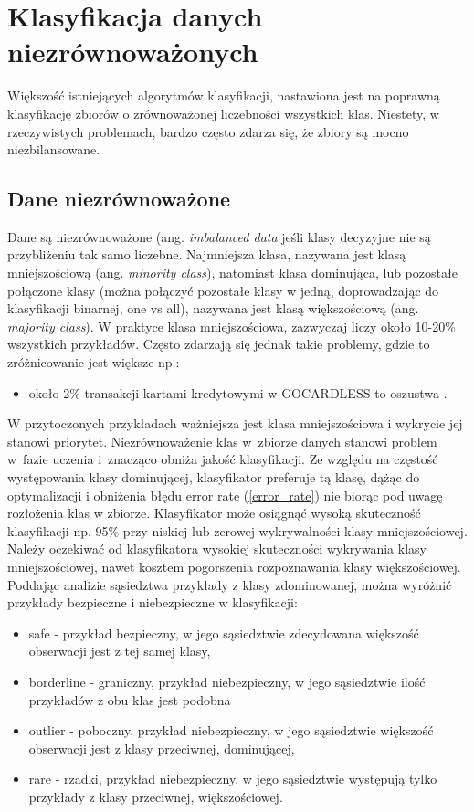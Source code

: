 \chapter{Klasyfikacja danych niezrównoważonych}

Większość istniejących algorytmów klasyfikacji, nastawiona jest na poprawną klasyfikację zbiorów o zrównoważonej liczebności wszystkich klas. Niestety, w rzeczywistych problemach, bardzo często zdarza się, że zbiory są mocno niezbilansowane.
\section{Dane niezrównoważone}
Dane są niezrównoważone (ang. \textit{imbalanced data} jeśli klasy decyzyjne nie są przybliżeniu tak samo liczebne. Najmniejsza klasa, nazywana jest klasą mniejszościową (ang. \textit{minority class}), natomiast klasa dominująca, lub pozostałe połączone klasy (można połączyć pozostałe klasy w jedną, doprowadzając do klasyfikacji binarnej, one vs all), nazywana jest klasą większościową (ang. \textit{majority class}). W praktyce klasa mniejszościowa, zazwyczaj liczy około 10-20\% wszystkich przykładów. Często zdarzają się jednak takie problemy, gdzie to zróżnicowanie jest większe np.:
\begin{itemize}
	\item około 2\% transakcji kartami kredytowymi w GOCARDLESS to oszustwa \cite{gocardless}.
	
\end{itemize}
W przytoczonych przykładach ważniejsza jest klasa mniejszościowa i wykrycie jej stanowi priorytet. Niezrównoważenie klas w zbiorze danych stanowi problem w fazie uczenia i znacząco obniża jakość klasyfikacji. Ze względu na częstość występowania klasy dominującej, klasyfikator preferuje tą klasę, dążąc do optymalizacji i obniżenia błędu error rate (\ref{error_rate}) nie biorąc pod uwagę rozłożenia klas w zbiorze. Klasyfikator może osiągnąć wysoką skuteczność klasyfikacji np. 95\% przy niskiej lub zerowej wykrywalności klasy mniejszościowej. 
Należy oczekiwać od klasyfikatora wysokiej skuteczności wykrywania klasy mniejszościowej, nawet kosztem pogorszenia rozpoznawania klasy większościowej.
Poddając analizie sąsiedztwa przykłady z klasy zdominowanej, można wyróżnić przykłady bezpieczne i niebezpieczne w klasyfikacji:
\begin{itemize}
	\item safe - przykład bezpieczny, w jego sąsiedztwie zdecydowana większość obserwacji jest z tej samej klasy,
	\item borderline - graniczny, przykład niebezpieczny, w jego sąsiedztwie ilość przykładów z obu klas jest podobna
	\item outlier - poboczny, przykład niebezpieczny, w jego sąsiedztwie większość obserwacji jest z klasy przeciwnej, dominującej,
	\item rare - rzadki, przykład niebezpieczny, w jego sąsiedztwie występują tylko przykłady z klasy przeciwnej, większościowej.
\end{itemize}

